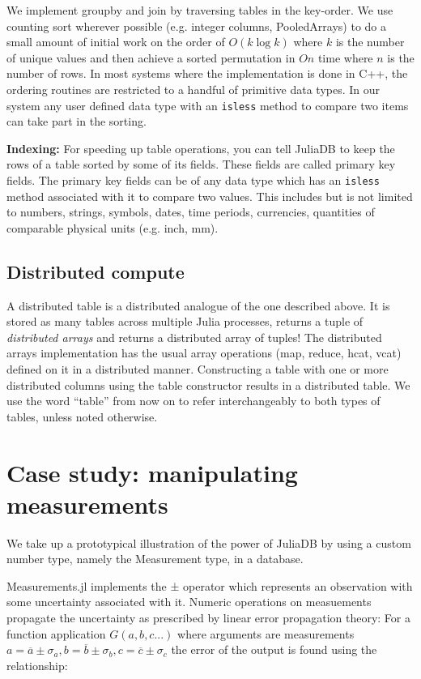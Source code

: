 \documentclass{juliacon}
\begin{document}
We implement groupby and join by traversing tables in the key-order. We use counting sort wherever possible (e.g. integer columns, PooledArrays) to do a small amount of initial work on the order of $O(k \log k)$ where $k$ is the number of unique values and then achieve a sorted permutation in $O n$ time where $n$ is the number of rows. In most systems where the implementation is done in C++, the ordering routines are restricted to a handful of primitive data types. In our system any user defined data type with an \texttt{isless} method to compare two items can take part in the sorting.

\textbf{Indexing: }For speeding up table operations, you can tell
JuliaDB to keep the rows of a table sorted by some of its fields.
These fields are called primary key fields. The primary key fields
can be of any data type which has an \texttt{isless} method associated
with it to compare two values. This includes but is not limited to
numbers, strings, symbols, dates, time periods, currencies, quantities
of comparable physical units (e.g. inch, mm).

\subsection{Distributed compute}

A distributed table is a distributed analogue of the one described
above. It is stored as many tables across multiple Julia processes,
 returns a tuple of \emph{distributed arrays} and
 returns a distributed array of tuples! The distributed
arrays implementation has the usual array operations (map, reduce,
hcat, vcat) defined on it in a distributed manner. Constructing a
table with one or more distributed columns using the table constructor
results in a distributed table. We use the word ``table'' from now on to refer interchangeably to both types of tables, unless
noted otherwise.

\section{Case study: manipulating measurements}
\label{sec:measurements}

We take up a prototypical illustration of the power of JuliaDB by using a custom number type, namely the Measurement type, in a database.

Measurements.jl implements the ± operator which represents an observation with some uncertainty associated with it. Numeric operations on measuements propagate the uncertainty as prescribed by linear error propagation theory: For a function application $G(a,b,c...)$ where arguments are measurements $a=\overline{a} \pm \sigma_{a}, b=\overline{b} \pm \sigma_{b}, c=\overline{c} \pm \sigma_{c}$ the error of the output is found using the relationship: 
\end{document}
